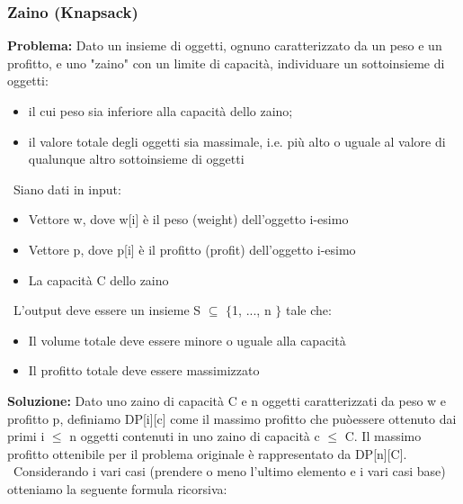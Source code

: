 \documentclass[../cheatSheetAlgoritmi.tex]{subfiles}
\begin{document}
\subsubsection{Zaino (Knapsack)}
\textbf{Problema:} Dato un insieme di oggetti, ognuno caratterizzato da un peso e un
profitto, e uno "zaino" con un limite di capacità, individuare un
sottoinsieme di oggetti: 
\begin{itemize}
	\item il cui peso sia inferiore alla capacità dello zaino;
	\item il valore totale degli oggetti sia massimale, i.e. più alto o uguale al valore di qualunque altro sottoinsieme di oggetti
\end{itemize} \
Siano dati in input: 
\begin{itemize}
	\item Vettore w, dove w[i] è il peso (weight) dell’oggetto i-esimo
	\item Vettore p, dove p[i] è il profitto (profit) dell’oggetto i-esimo
	\item La capacità C dello zaino
\end{itemize} \
L'output deve essere un insieme S  $\subseteq$ $\{$1, ..., n $\}$ tale che:
\begin{itemize}
	\item Il volume totale deve essere minore o uguale alla capacità 
	\item Il profitto totale deve essere massimizzato\\
\end{itemize} 
\textbf{Soluzione:} Dato uno zaino di capacità C e n oggetti caratterizzati da peso w e profitto p, definiamo DP[i][c] come il massimo profitto che puòessere ottenuto dai primi i $\leq$ n oggetti contenuti in uno zaino di
capacità c $\leq$ C. Il massimo profitto ottenibile per il problema originale è rappresentato da DP[n][C]. \ Considerando i vari casi (prendere o meno l'ultimo elemento e i vari casi base) otteniamo la seguente formula ricorsiva: 
\end{document}
